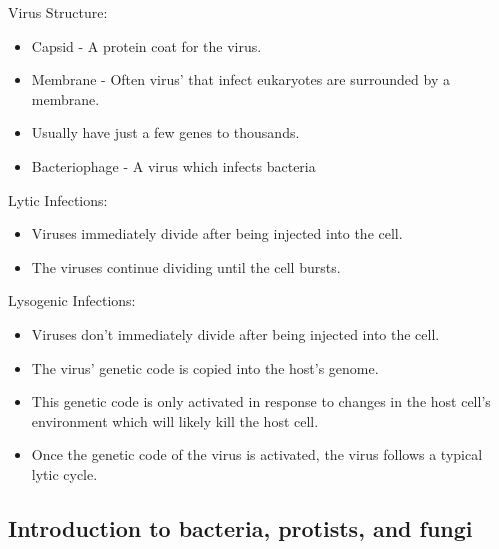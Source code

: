 \documentclass{article}
\begin{document}
Virus Structure:
\begin{itemize}
\item Capsid - A protein coat for the virus.
\item Membrane - Often virus' that infect eukaryotes are surrounded by a membrane.
\item Usually have just a few genes to thousands.
\item Bacteriophage - A virus which infects bacteria
\end{itemize}
Lytic Infections:
\begin{itemize}
\item Viruses immediately divide after being injected into the cell.
\item The viruses continue dividing until the cell bursts.
\end{itemize}
Lysogenic Infections:
\begin{itemize}
\item Viruses don't immediately divide after being injected into the cell.
\item The virus' genetic code is copied into the host's genome.
\item This genetic code is only activated in response to changes in the host cell's environment which will likely kill the 
host cell.
\item Once the genetic code of the virus is activated, the virus follows a typical lytic cycle.
\end{itemize}

\subsection{Introduction to bacteria, protists, and fungi}
\end{document}
